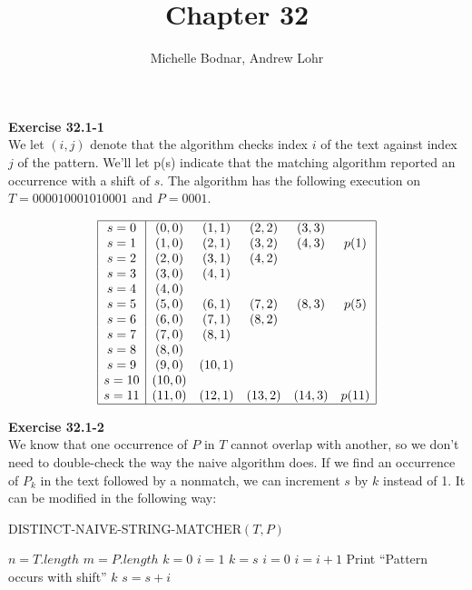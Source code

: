 \documentclass{article}
\title{Chapter 32}
\author{Michelle Bodnar, Andrew Lohr}
\begin{document}
\maketitle
\noindent\textbf{Exercise 32.1-1}\\

We let $(i,j)$ denote that the algorithm checks index $i$ of the text against index $j$ of the pattern. We'll let p(s) indicate that the matching algorithm reported an occurrence with a shift of $s$. The algorithm has the following execution on $T = 000010001010001$ and $P = 0001$.

\[
\begin{array}{|c|ccccc|}
\hline
s=0&(0,0)&(1,1)&(2,2)&(3,3)&\\
s=1&(1,0)&(2,1)&(3,2)&(4,3)&p(1)\\
s=2&(2,0)&(3,1)&(4,2)&&\\
s=3&(3,0)&(4,1)&&&\\
s=4&(4,0)&&&&\\
s=5&(5,0)&(6,1)&(7,2)&(8,3)&p(5)\\
s=6&(6,0)&(7,1)&(8,2)&&\\
s=7&(7,0)&(8,1)&&&\\
s=8&(8,0)&&&&\\
s=9&(9,0)&(10,1)&&&\\
s=10&(10,0)&&&&\\
s=11&(11,0)&(12,1)&(13,2)&(14,3)&p(11)\\
\hline
\end{array}
\]

\noindent\textbf{Exercise 32.1-2}\\

We know that one occurrence of $P$ in $T$ cannot overlap with another, so we don't need to double-check the way the naive algorithm does.  If we find an occurrence of $P_k$ in the text followed by a nonmatch, we can increment $s$ by $k$ instead of 1.  It can be modified in the following way:

\begin{algorithm}
\caption{DISTINCT-NAIVE-STRING-MATCHER$(T,P)$}
\begin{algorithmic}
\State $n = T.length$ 
\State $m = P.length$
\State $k=0$
	\State $i=1$
		\State $k = s$
		\State $i=0$
			$i = i+1$
				\State Print ``Pattern occurs with shift'' $k$
			\EndIf
		\EndWhile
	\EndIf
	\State $s = s+i$
\EndWhile
\end{algorithmic}
\end{algorithm}
\end{document}
